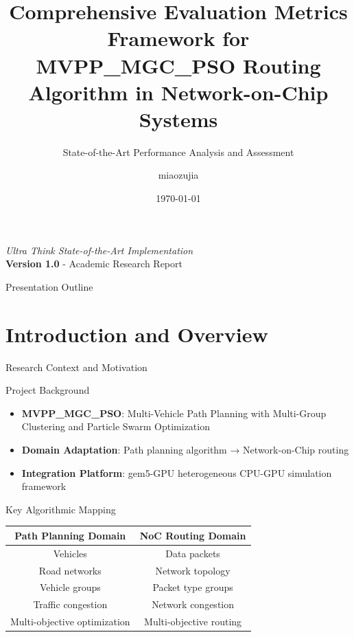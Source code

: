 \documentclass[10pt,aspectratio=169]{beamer}
\title[MVPP\_MGC\_PSO Evaluation Metrics]{Comprehensive Evaluation Metrics Framework for MVPP\_MGC\_PSO Routing Algorithm in Network-on-Chip Systems}
\subtitle{State-of-the-Art Performance Analysis and Assessment}
\author[miaozujia]{miaozujia}
\institute{SIAT (Shenzhen Institute of Advanced Technology, Chinese Academy of Sciences)}
\date{\today}
\begin{document}
\begin{frame}
    \titlepage
    \begin{center}
        \small
        \textit{Ultra Think State-of-the-Art Implementation} \\
        \textbf{Version 1.0} - Academic Research Report
    \end{center}
\end{frame}

\begin{frame}{Presentation Outline}
    \tableofcontents
\end{frame}

\section{Introduction and Overview}

\begin{frame}{Research Context and Motivation}
    \begin{block}{Project Background}
        \begin{itemize}
            \item \textbf{MVPP\_MGC\_PSO}: Multi-Vehicle Path Planning with Multi-Group Clustering and Particle Swarm Optimization
            \item \textbf{Domain Adaptation}: Path planning algorithm → Network-on-Chip routing
            \item \textbf{Integration Platform}: gem5-GPU heterogeneous CPU-GPU simulation framework
        \end{itemize}
    \end{block}
    
    \begin{block}{Key Algorithmic Mapping}
        \begin{center}
        \begin{tabular}{c@{\,→\,}c}
            \textbf{Path Planning Domain} & \textbf{NoC Routing Domain} \\
            \hline
            Vehicles & Data packets \\
            Road networks & Network topology \\
            Vehicle groups & Packet type groups \\
            Traffic congestion & Network congestion \\
            Multi-objective optimization & Multi-objective routing \\
        \end{tabular}
        \end{center}
    \end{block}
\end{frame}
\end{document}
